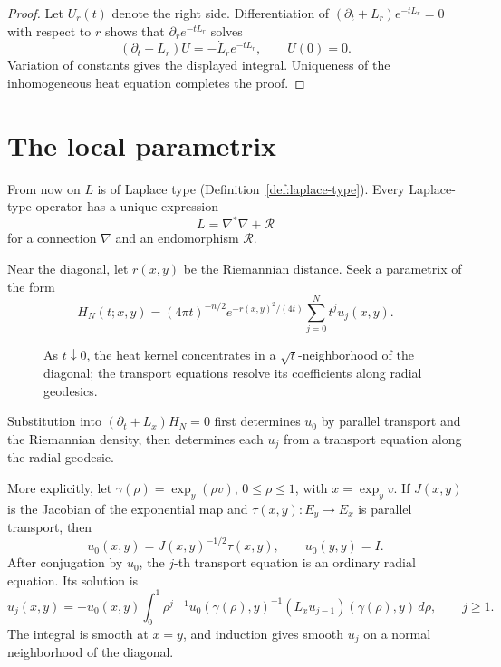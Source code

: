 \documentclass[11pt,oneside,reqno]{book}
\theoremstyle{plain}
\theoremstyle{definition}
\theoremstyle{remark}
\begin{document}
\begin{proof}
Let \(U_r(t)\) denote the right side. Differentiation of
\((\partial_t+L_r)e^{-tL_r}=0\) with respect to \(r\) shows that
\(\partial_r e^{-tL_r}\) solves
\[
 (\partial_t+L_r)U=-\dot L_r e^{-tL_r},\qquad U(0)=0.
\]
Variation of constants gives the displayed integral. Uniqueness of the
inhomogeneous heat equation completes the proof.
\end{proof}

\section{The local parametrix}

From now on \(L\) is of Laplace type (Definition~\ref{def:laplace-type}).
Every Laplace-type operator has a unique expression
\[
 L=\nabla^*\nabla+\mathcal R
\]
for a connection \(\nabla\) and an endomorphism \(\mathcal R\).

Near the diagonal, let \(r(x,y)\) be the Riemannian distance. Seek a
parametrix of the form
\[
 H_N(t;x,y)
 =
 (4\pi t)^{-n/2}e^{-r(x,y)^2/(4t)}
 \sum_{j=0}^Nt^j u_j(x,y).
\]

\begin{figure}[htbp]
\centering
{}
\caption[Heat-kernel localization near the diagonal]{As \(t\downarrow0\), the heat kernel concentrates in a
\(\sqrt t\)-neighborhood of the diagonal; the transport equations resolve
its coefficients along radial geodesics.}
\end{figure}

Substitution into \((\partial_t+L_x)H_N=0\) first determines \(u_0\) by
parallel transport and the Riemannian density, then determines each
\(u_j\) from a transport equation along the radial geodesic.

More explicitly, let \(\gamma(\rho)=\exp_y(\rho v)\), \(0\leq\rho\leq1\),
with \(x=\exp_yv\). If \(J(x,y)\) is the Jacobian of the exponential map
and \(\tau(x,y):E_y\to E_x\) is parallel transport, then
\[
 u_0(x,y)=J(x,y)^{-1/2}\tau(x,y),
\qquad
 u_0(y,y)=I.
\]
After conjugation by \(u_0\), the \(j\)-th transport equation is an
ordinary radial equation. Its solution is
\[
 u_j(x,y)
 =
 -u_0(x,y)\int_0^1\rho^{j-1}
 u_0(\gamma(\rho),y)^{-1}
 (L_xu_{j-1})(\gamma(\rho),y)\,d\rho,
 \qquad j\geq1.
\]
The integral is smooth at \(x=y\), and induction gives smooth \(u_j\) on a
normal neighborhood of the diagonal.
\end{document}
